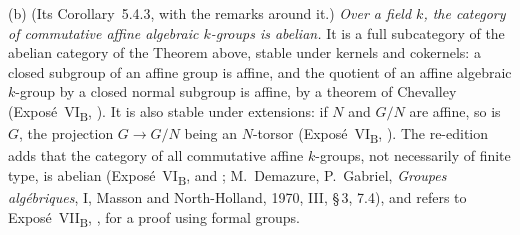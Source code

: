 (b) (Its Corollary~5.4.3, with the remarks around it.) \emph{Over a field \(k\), the category of
commutative affine algebraic \(k\)-groups is abelian.} It is a full subcategory of the abelian
category of the Theorem above, stable under kernels and cokernels: a closed subgroup of an affine
group is affine, and the quotient of an affine algebraic \(k\)-group by a closed normal subgroup is
affine, by a theorem of Chevalley (Exposé~VI\textsubscript{B}, ).
It is also stable under extensions: if \(N\) and \(G/N\) are affine, so is \(G\), the projection
\(G\to G/N\) being an \(N\)-torsor (Exposé~VI\textsubscript{B}, ).
The re-edition adds that the category of all commutative affine \(k\)-groups, not necessarily of
finite type, is abelian (Exposé~VI\textsubscript{B},  and
; M.~Demazure, P.~Gabriel, \emph{Groupes algébriques}, I,
Masson and North-Holland, 1970, III, \S\,3, 7.4), and refers to Exposé~VII\textsubscript{B},
, for a proof using formal groups.
